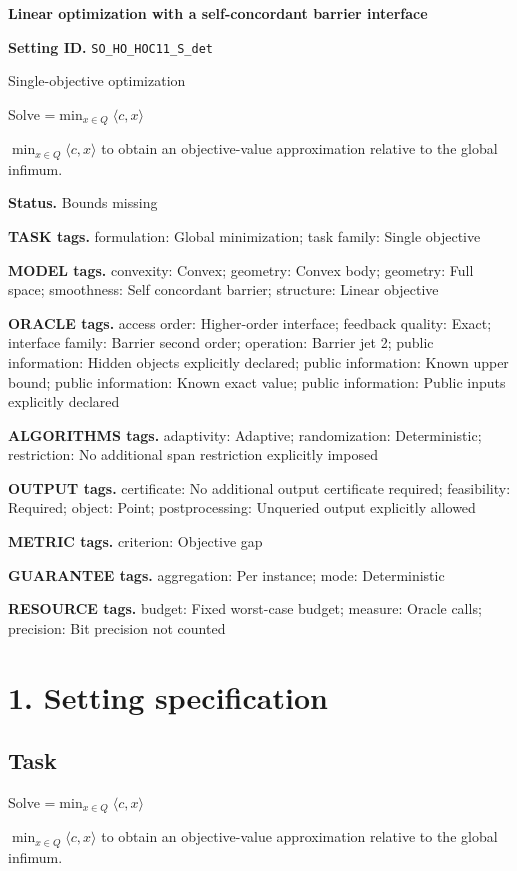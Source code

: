 \documentclass[10pt,a4paper]{article}
\newcommand{\AtlasMath}[1]{\par\begingroup\centering\setbox0=\hbox{$\displaystyle #1$}\ifdim\wd0>1.4\linewidth\typeout{ATLAS WIDE FORMULA: \the\wd0}\fi\ifdim\wd0>\linewidth\resizebox{\linewidth}{!}{\box0}\else\box0\fi\par\endgroup}
\newcommand{\AtlasInlineMath}[1]{\begingroup\setbox0=\hbox{$#1$}\ifdim\wd0>.4\linewidth\endgroup\AtlasMath{#1}\else\endgroup$#1$\fi}
\begin{document}
\raggedright

{\LARGE\bfseries\sffamily\color{AtlasNavy} Linear optimization with a self-concordant barrier interface\par}\vspace{5pt}
\textbf{Setting ID.} \texttt{SO\_\allowbreak{}HO\_\allowbreak{}HOC11\_\allowbreak{}S\_\allowbreak{}det}

Single-objective optimization

Solve \AtlasInlineMath{\min_{x\in Q}\langle c,x\rangle} to obtain an objective-value approximation relative to the global infimum.

\textbf{Status.} Bounds missing

\textbf{TASK tags.} formulation: Global minimization; task family: Single objective

\textbf{MODEL tags.} convexity: Convex; geometry: Convex body; geometry: Full space; smoothness: Self concordant barrier; structure: Linear objective

\textbf{ORACLE tags.} access order: Higher-order interface; feedback quality: Exact; interface family: Barrier second order; operation: Barrier jet 2; public information: Hidden objects explicitly declared; public information: Known upper bound; public information: Known exact value; public information: Public inputs explicitly declared

\textbf{ALGORITHMS tags.} adaptivity: Adaptive; randomization: Deterministic; restriction: No additional span restriction explicitly imposed

\textbf{OUTPUT tags.} certificate: No additional output certificate required; feasibility: Required; object: Point; postprocessing: Unqueried output explicitly allowed

\textbf{METRIC tags.} criterion: Objective gap

\textbf{GUARANTEE tags.} aggregation: Per instance; mode: Deterministic

\textbf{RESOURCE tags.} budget: Fixed worst-case budget; measure: Oracle calls; precision: Bit precision not counted

\section{1. Setting specification}
\subsection{Task}
Solve \AtlasInlineMath{\min_{x\in Q}\langle c,x\rangle} to obtain an objective-value approximation relative to the global infimum.
\end{document}
